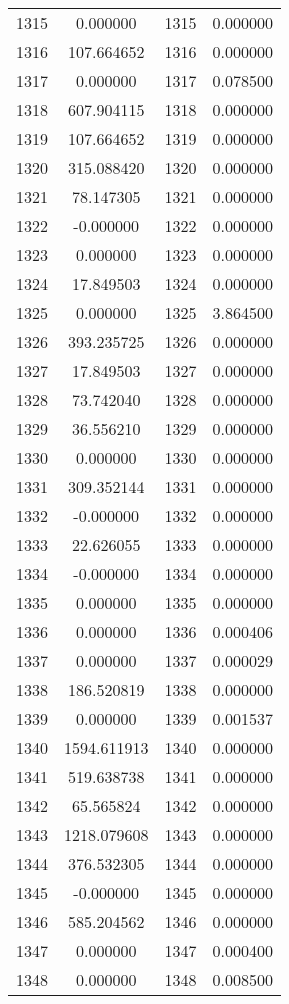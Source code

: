 \documentclass[12pt]{article}
\begin{document}
\begin{longtable}{@{}cccc@{}}
1315 & 0.000000 & 1315 & 0.000000 \\
1316 & 107.664652 & 1316 & 0.000000 \\
1317 & 0.000000 & 1317 & 0.078500 \\
1318 & 607.904115 & 1318 & 0.000000 \\
1319 & 107.664652 & 1319 & 0.000000 \\
1320 & 315.088420 & 1320 & 0.000000 \\
1321 & 78.147305 & 1321 & 0.000000 \\
1322 & -0.000000 & 1322 & 0.000000 \\
1323 & 0.000000 & 1323 & 0.000000 \\
1324 & 17.849503 & 1324 & 0.000000 \\
1325 & 0.000000 & 1325 & 3.864500 \\
1326 & 393.235725 & 1326 & 0.000000 \\
1327 & 17.849503 & 1327 & 0.000000 \\
1328 & 73.742040 & 1328 & 0.000000 \\
1329 & 36.556210 & 1329 & 0.000000 \\
1330 & 0.000000 & 1330 & 0.000000 \\
1331 & 309.352144 & 1331 & 0.000000 \\
1332 & -0.000000 & 1332 & 0.000000 \\
1333 & 22.626055 & 1333 & 0.000000 \\
1334 & -0.000000 & 1334 & 0.000000 \\
1335 & 0.000000 & 1335 & 0.000000 \\
1336 & 0.000000 & 1336 & 0.000406 \\
1337 & 0.000000 & 1337 & 0.000029 \\
1338 & 186.520819 & 1338 & 0.000000 \\
1339 & 0.000000 & 1339 & 0.001537 \\
1340 & 1594.611913 & 1340 & 0.000000 \\
1341 & 519.638738 & 1341 & 0.000000 \\
1342 & 65.565824 & 1342 & 0.000000 \\
1343 & 1218.079608 & 1343 & 0.000000 \\
1344 & 376.532305 & 1344 & 0.000000 \\
1345 & -0.000000 & 1345 & 0.000000 \\
1346 & 585.204562 & 1346 & 0.000000 \\
1347 & 0.000000 & 1347 & 0.000400 \\
1348 & 0.000000 & 1348 & 0.008500 \\

\end{longtable}
\end{document}

